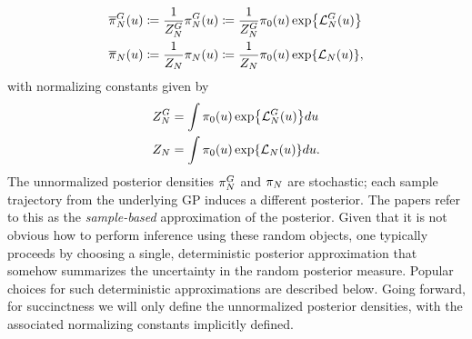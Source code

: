 \documentclass[12pt]{article}
\begin{document}
\begin{align}
\fwdEmRdm[\Ndesign]{\postDensNorm}(\Par) 
&\Def \frac{1}{\fwdEmRdm[\Ndesign]{\normCst}} \fwdEmRdmDens[\Ndesign](\Par) 
\Def  \frac{1}{\fwdEmRdm[\Ndesign]{\normCst}} \priorDens(\Par) \Exp{\llikEmFwd[\Ndesign](\Par)} \label{post_dens_random_fwd} \\
\llikEmRdm[\Ndesign]{\postDensNorm}(\Par) 
&\Def \frac{1}{\llikEmRdm[\Ndesign]{\normCst}} \llikEmRdmDens[\Ndesign](\Par) 
\Def \frac{1}{\llikEmRdm[\Ndesign]{\normCst}} \priorDens(\Par) \Exp{\llikEm[\Ndesign](\Par)} \label{post_dens_random_llik},
\end{align}
with normalizing constants given by 
\begin{align}
\fwdEmRdm[\Ndesign]{\normCst}
&= \int \priorDens(\Par) \Exp{\llikEmFwd[\Ndesign](\Par)} d\Par \label{norm_cst_random_fwd} \\
\llikEmRdm[\Ndesign]{\normCst}
&= \int \priorDens(\Par) \Exp{\llikEm[\Ndesign](\Par)} d\Par \label{norm_cst_random_llik}. 
\end{align}
The unnormalized posterior densities $\fwdEmRdmDens[\Ndesign]$ and $\llikEmRdmDens[\Ndesign]$ are stochastic; 
each sample trajectory from the underlying GP induces a different posterior. 
The papers \cite{StuartTeck1, StuartTeck2} refer to this as the \textit{sample-based}
approximation of the posterior. Given that it is not obvious how to perform inference using these random objects, one typically 
proceeds by choosing a single, deterministic posterior approximation that somehow summarizes the uncertainty in the 
random posterior measure. Popular choices for such deterministic approximations are described below. Going forward, 
for succinctness we will only define the unnormalized posterior densities, with the associated normalizing constants  
implicitly defined. 
\end{document}
